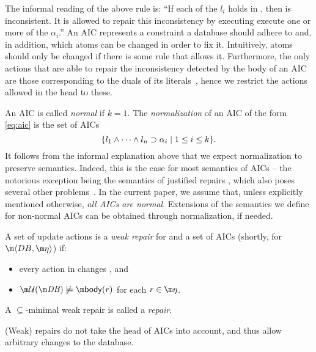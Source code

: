 The informal reading of the above rule is: ``If each of the $l_i$ holds in \db, then \db is inconsistent. 
It is allowed to repair this inconsistency by executing execute one or more of the $\alpha_i$.''
An AIC represents a constraint a database should adhere to and, in addition, which atoms can be changed in order to fix it. Intuitively, atoms should only be changed if there is some rule that allows it.
Furthermore, the only actions that are able to repair the inconsistency detected by the body of an AIC are those corresponding to the duals of its literals~\cite{iclp/CaropreseGSZ06}, hence we restrict the actions allowed in the head to these.


An AIC is called \emph{normal} if $k=1$. The \emph{normalization} of an AIC of the form \eqref{eq:aic} is the set of AICs 
\[\{l_1\land \dots\land l_n\supset \alpha_i\mid 1\leq i\leq k\}.\]
It follows from the informal explanation above that we expect normalization to preserve semantics. Indeed, this is the case for most semantics of AICs -- the notorious exception being the semantics of justified repairs \cite{tplp/CaropreseT11}, which also poses several other problems~\cite{tase/Cruz-FilipeEGN13}.
In the current paper, we assume that, unless explicitly mentioned otherwise, \emph{all AICs are normal}. Extensions of the semantics we define for non-normal AICs can be obtained through normalization, if needed.

\begin{definition}
 A set of update actions \UU is a \emph{weak repair} for \db and a set \aics of AICs (shortly, for $\fulldb$) if:
 \begin{itemize}
  \item every action in \UU changes \db, and 
  \item $\UU(\db)\not\models \body(r)$ for each $r\in\aics$.
 \end{itemize}
A $\subseteq$-minimal weak repair is called a \emph{repair}.
\end{definition}

(Weak) repairs do not take the head of AICs into account, and thus allow arbitrary changes to the database.

